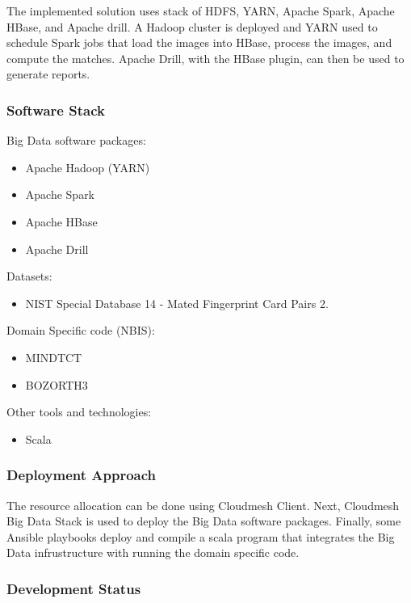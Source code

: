 \documentclass[9pt,twocolumn,twoside]{styles/osajnl}
\begin{document}
The implemented solution uses stack of HDFS, YARN, Apache Spark,
Apache HBase, and Apache drill. A Hadoop cluster is deployed and YARN
used to schedule Spark jobs that load the images into HBase, process
the images, and compute the matches. Apache Drill, with the HBase
plugin, can then be used to generate reports.

\subsubsection{Software Stack}

Big Data software packages:

\begin{itemize}
\item Apache Hadoop (YARN)
\item Apache Spark
\item Apache HBase
\item Apache Drill
\end{itemize}

Datasets:
\begin{itemize}
\item NIST Special Database 14 - Mated Fingerprint Card Pairs 2.
\end{itemize}

Domain Specific code (NBIS):
\begin{itemize}
\item MINDTCT
\item BOZORTH3
\end{itemize}


Other tools and technologies:
\begin{itemize}
\item Scala
\end{itemize}

\subsubsection{Deployment Approach}

The resource allocation can be done using Cloudmesh Client.
Next, Cloudmesh Big Data Stack is used to deploy the Big Data software packages.
Finally, some Ansible playbooks deploy and compile a scala program that integrates the Big Data infrustructure with running the domain specific code.

\subsubsection{Development Status}
\end{document}
